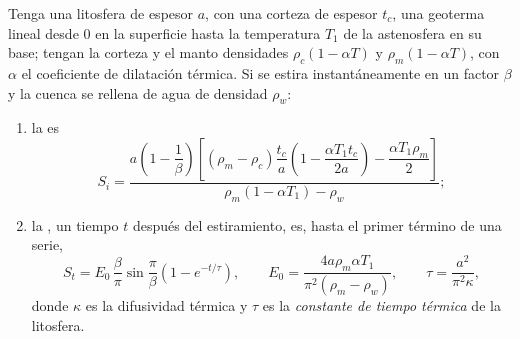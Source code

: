\begin{proposition}\label{prop:b2:basins-compared:stretching}
Tenga una litosfera de espesor $a$, con una corteza de espesor $t_c$, una geoterma lineal desde
$0$ en la superficie hasta la temperatura $T_1$ de la astenosfera en su base; tengan la corteza y el manto
densidades $\rho_c(1 - \alpha T)$ y $\rho_m(1 - \alpha T)$, con $\alpha$ el coeficiente de dilatación
térmica. Si se estira instantáneamente en un factor $\beta$ y la cuenca se rellena de
agua de densidad $\rho_w$:
\begin{enumerate}
  \item la  es
  \[
    S_i = \frac{a\left(1 - \dfrac{1}{\beta}\right)\left[(\rho_m - \rho_c)\dfrac{t_c}{a}
          \left(1 - \dfrac{\alpha T_1 t_c}{2a}\right) - \dfrac{\alpha T_1 \rho_m}{2}\right]}
          {\rho_m(1 - \alpha T_1) - \rho_w};
  \]
  \item la , un tiempo $t$ después del estiramiento, es, hasta el primer término de una serie,
  \[
    S_t = E_0\,\frac{\beta}{\pi}\sin\frac{\pi}{\beta}\left(1 - e^{-t/\tau}\right),\qquad
    E_0 = \frac{4a\rho_m\alpha T_1}{\pi^2(\rho_m - \rho_w)},\qquad
    \tau = \frac{a^2}{\pi^2\kappa},
  \]
  donde $\kappa$ es la difusividad térmica y $\tau$ es la \emph{constante de tiempo
  térmica} de la litosfera.
\end{enumerate}
\end{proposition}

